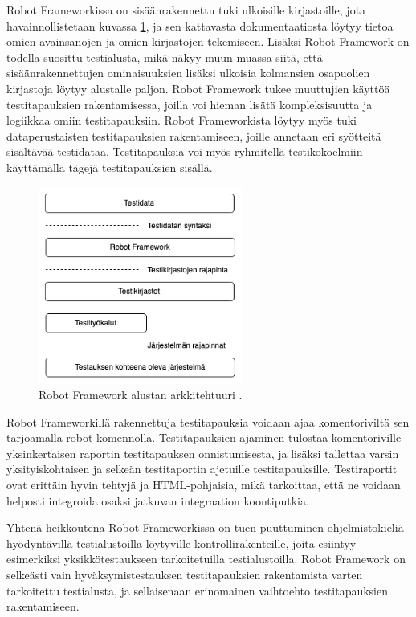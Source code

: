     Robot Frameworkissa on sisäänrakennettu tuki ulkoisille kirjastoille, jota havainnollistetaan kuvassa \ref{fig:robot-architecture}, ja sen kattavasta dokumentaatiosta löytyy tietoa omien avainsanojen ja omien kirjastojen tekemiseen.
    Lisäksi Robot Framework on todella suosittu testialusta, mikä näkyy muun muassa siitä, että sisäänrakennettujen ominaisuuksien lisäksi ulkoisia kolmansien osapuolien kirjastoja löytyy alustalle paljon.
    Robot Framework tukee muuttujien käyttöä testitapauksien rakentamisessa, joilla voi hieman lisätä kompleksisuutta ja logiikkaa omiin testitapauksiin.
    Robot Frameworkista löytyy myös tuki dataperustaisten testitapauksien rakentamiseen, joille annetaan eri syötteitä sisältävää testidataa.
    Testitapauksia voi myös ryhmitellä testikokoelmiin käyttämällä tägejä testitapauksien sisällä.

    \begin{figure}[H]
      \centering
      \includegraphics[width=0.6\textwidth]{assets/robot-arkkitehtuuri.png}
      \caption{Robot Framework alustan arkkitehtuuri \parencite{robot_framework_user_guide}.}
      \label{fig:robot-architecture}
    \end{figure}

    Robot Frameworkillä rakennettuja testitapauksia voidaan ajaa komentoriviltä sen tarjoamalla robot-komennolla.
    Testitapauksien ajaminen tulostaa komentoriville yksinkertaisen raportin testitapauksen onnistumisesta, ja lisäksi tallettaa varsin yksityiskohtaisen ja selkeän testitaportin ajetuille testitapauksille.
    Testiraportit ovat erittäin hyvin tehtyjä ja HTML-pohjaisia, mikä tarkoittaa, että ne voidaan helposti integroida osaksi jatkuvan integraation koontiputkia.

    Yhtenä heikkoutena Robot Frameworkissa on tuen puuttuminen ohjelmistokieliä hyödyntävillä testialustoilla löytyville kontrollirakenteille, joita esiintyy esimerkiksi yksikkötestaukseen tarkoitetuilla testialustoilla.
    Robot Framework on selkeästi vain hyväksymistestauksen testitapauksien rakentamista varten tarkoitettu testialusta, ja sellaisenaan erinomainen vaihtoehto testitapauksien rakentamiseen.

